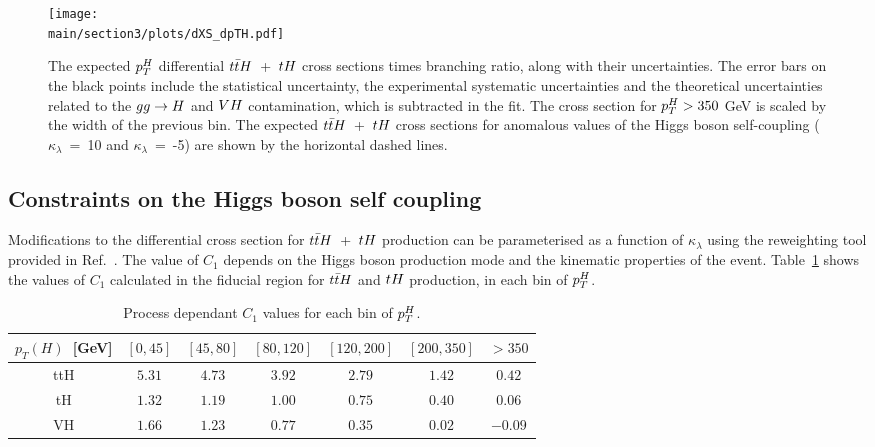 \begin{figure}[htb!]
        \centering
        \texttt{[image: \\main/section3/plots/dXS\_dpTH.pdf]}
        \caption{The expected $p_{T}^{H}$ differential $t\bar{t}H$~+~$tH$ cross sections times branching ratio, along with their uncertainties. The error bars on the black points include the statistical uncertainty, the experimental systematic uncertainties and the theoretical uncertainties related to the $gg\rightarrow H$ and $VH$ contamination, which is subtracted in the fit.  The cross section for $p_{T}^{H}>350$ GeV is scaled by the width of the previous bin. The expected $t\bar{t}H$~+~$tH$ cross sections for anomalous values of the Higgs boson self-coupling ($\kappa_\lambda$~=~10 and $\kappa_\lambda$~=~-5) are shown by the horizontal dashed lines.}
        \label{fig:ttHdiff_CMS_ptH_xs}
\end{figure}

\subsection{Constraints on the Higgs boson self coupling}

Modifications to the differential cross section for $t\bar{t}H$~+~$tH$ production can be parameterised as a function of $\kappa_\lambda$ using the reweighting tool provided in Ref.~\cite{EWreweightingtool}. The value of $C_{1}$ depends on the Higgs boson production mode and the kinematic properties of the event. Table~\ref{tab:ttHdiff_CMS_c1_values} shows the values of $C_1$ calculated in the fiducial region for $t\bar{t}H$ and $tH$ production, in each bin of $p_{T}^{H}$.

\begin{table}[t!]
\begin{center}
\begin{tabular}{|c |c| c| c| c| c| c|}
\hline
   $p_T(H)$~[GeV] & $[0, 45]$  & $[45, 80]$ & $[80, 120]$ & $[120, 200]$ &  $[200, 350]$ &  $>350$ \\ 
\hline
\hline
ttH & $5.31$ & $4.73$ & $3.92$ & $2.79$ & $1.42$ & $0.42$ \\
\hline
tH & $1.32$ &$1.19$ & $1.00$ & $0.75$ & $0.40$ & $0.06$ \\
\hline 
VH & $1.66$ & $1.23$ & $0.77$ & $0.35$ & $0.02$ & $-0.09$ \\
\hline
\end{tabular}
 \caption{Process dependant $C_{1}$ values for each bin of $p_{T}^{H}$.}
\label{tab:ttHdiff_CMS_c1_values}
\end{center}
\end{table}


